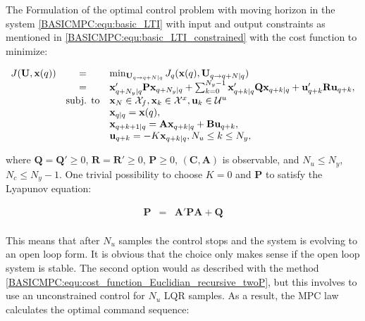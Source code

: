 The Formulation of the optimal control problem with moving horizon \cite{goodwin2006constrained} in the system \ref{BASICMPC:equ:basic_LTI} with input and output constraints as mentioned in \ref{BASICMPC:equ:basic_LTI_constrained} with the cost function to minimize:
		
		\begin{equation}
        \begin{array}{rcl}
				J(\textbf{U},\textbf{x}(q))&=&\min_{\textbf{U}_{q\rightarrow q+N|q}}J_q(\textbf{x}(q),\textbf{U}_{q\rightarrow q+N|q})\\
                &=&\textbf{x}'_{q+N_y|q}\textbf{P}\textbf{x}_{q+N_y|q}+\sum^{N_y-1}_{k=0}\textbf{x}'_{q+k|q}\textbf{Q}\textbf{x}_{q+k|q}+\textbf{u}'_{q+k}\textbf{R}\textbf{u}_{q+k},\\
				&\textnormal{subj. to}&\textbf{x}_N\in\mathcal{X}_f,\textbf{x}_k\in\mathcal{X}^x,\textbf{u}_k\in\mathcal{U}^u\\
				&&\textbf{x}_{q|q}=\textbf{x}(q),\\
				&&\textbf{x}_{q+k+1|q}=\textbf{A}\textbf{x}_{q+k|q}+\textbf{B}\textbf{u}_{q+k},\\
				&&\textbf{u}_{q+k}=-K\textbf{x}_{q+k|q}, N_u\leq k\leq N_y,\\
        \end{array}
        \label{BASICMPC:equ:receiding_horison_problem}
    \end{equation}
		
		where $\textbf{Q}=\textbf{Q}'\geq0$, $\textbf{R}=\textbf{R}'\geq0$, $\textbf{P}\geq0$, $(\textbf{C},\textbf{A})$ is observable, and $N_u\leq N_y$, $N_c\leq N_y-1$. One trivial possibility to choose $K=0$ and $\textbf{P}$ to satisfy the Lyapunov equation:
		
		\begin{equation}
        \begin{array}{rcl}
				\textbf{P}&=&\textbf{A}'\textbf{PA}+\textbf{Q}\\
        \end{array}
        \label{BASICMPC:equ:receiding_horison_Lyapunov}
    \end{equation}
		
		This means that after $N_u$ samples the control stops and the system is evolving to an open loop form. It is obvious that the choice only makes sense if the open loop system is stable. The second option would as described with the method \ref{BASICMPC:equ:cost_function_Euclidian_recursive_twoP}, but this involves to use an unconstrained control for $N_u$ LQR samples. As a result, the MPC law calculates the optimal command sequence:
		
